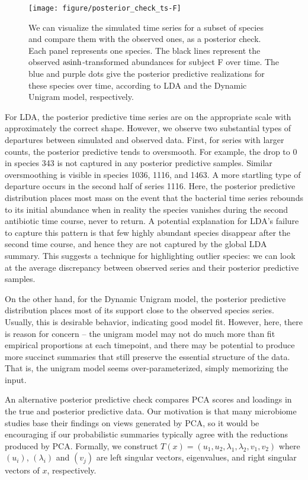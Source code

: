 \documentclass{article}
\begin{document}
\begin{figure}[!p]
  \centering
  \texttt{[image: figure/posterior\_check\_ts-F]}
  \caption{We can visualize the simulated time series for a subset of species
    and compare them with the observed ones, as a posterior check. Each panel
    represents one species. The black lines represent the observed
    $\mathop\mathrm{asinh}$-transformed abundances for subject F over time. The blue and purple
    dots give the posterior predictive realizations for these species over time,
    according to LDA and the Dynamic Unigram model, respectively.
    \label{fig:antibiotics_posterior_ts}}
\end{figure}

For LDA, the posterior predictive time series are on the appropriate scale with
approximately the correct shape. However, we observe two substantial types of
departures between simulated and observed data. First, for series with larger
counts, the posterior predictive tends to oversmooth. For example, the drop to 0
in species 343 is not captured in any posterior predictive samples. Similar
oversmoothing is visible in species 1036, 1116, and 1463. A more startling type of
departure occurs in the second half of series 1116. Here, the posterior
predictive distribution places most mass on the event that the bacterial time
series rebounds to its initial abundance when in reality the species vanishes
during the second antibiotic time course, never to return. A potential
explanation for LDA's failure to capture this pattern is that few highly
abundant species disappear after the second time course, and hence they are not
captured by the global LDA summary. This suggests a technique for highlighting
outlier species: we can look at the average discrepancy between observed series
and their posterior predictive samples.

On the other hand, for the Dynamic Unigram model, the posterior predictive
distribution places most of its support close to the observed species series.
Usually, this is desirable behavior, indicating good model fit. However, here,
there is reason for concern -- the unigram model may not do much more than fit
empirical proportions at each timepoint, and there may be potential to produce
more succinct summaries that still preserve the essential structure of the data.
That is, the unigram model seems over-parameterized, simply memorizing the
input.

An alternative posterior predictive check compares PCA scores and loadings in
the true and posterior predictive data. Our motivation is that many microbiome
studies base their findings on views generated by PCA, so it would be
encouraging if our probabilistic summaries typically agree with the reductions
produced by PCA. Formally, we construct $T\left(x\right) = \left(u_{1}, u_{2},
\lambda_{1}, \lambda_{2}, v_{1}, v_{2}\right)$ where $\left(u_{i}\right)$,
$\left(\lambda_{i}\right)$ and $\left(v_{j}\right)$ are left singular vectors,
eigenvalues, and right singular vectors of $x$, respectively.
\end{document}
